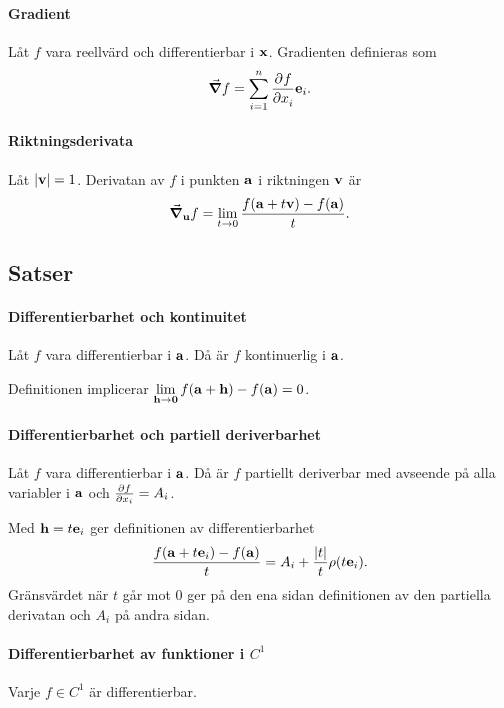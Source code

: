 \paragraph{Gradient}
Låt $f$ vara reellvärd och differentierbar i $\vect{x}$. Gradienten definieras som
\begin{align*}
	\grad{f} = \sum\limits_{i = 1}^{n}\pdeval{f}{x_i}{\vect{x}}\vect{e}_i.
\end{align*}

\paragraph{Riktningsderivata}
Låt $\abs{\vect{v}} = 1$. Derivatan av $f$ i punkten $\vect{a}$ i riktningen $\vect{v}$ är
\begin{align*}
	\grad_{\vect{u}}f = \limit{t}{0}\frac{f(\vect{a} + t\vect{v}) - f(\vect{a})}{t}.
\end{align*}

\subsection{Satser}

\paragraph{Differentierbarhet och kontinuitet}
Låt $f$ vara differentierbar i $\vect{a}$. Då är $f$ kontinuerlig i $\vect{a}$.

\proof
Definitionen implicerar $\limit{\vect{h}}{\vect{0}}f(\vect{a} + \vect{h}) - f(\vect{a}) = 0$.

\paragraph{Differentierbarhet och partiell deriverbarhet}
Låt $f$ vara differentierbar i $\vect{a}$. Då är $f$ partiellt deriverbar med avseende på alla variabler i $\vect{a}$ och $\pdv{f}{x_i}(\vect{a}) = A_i$.

\proof
Med $\vect{h} = t\vect{e}_i$ ger definitionen av differentierbarhet
\begin{align*}
	\frac{f(\vect{a} + t\vect{e}_i) - f(\vect{a})}{t} = A_i + \frac{\abs{t}}{t}\rho(t\vect{e}_i).
\end{align*}
Gränsvärdet när $t$ går mot $0$ ger på den ena sidan definitionen av den partiella derivatan och $A_i$ på andra sidan.

\paragraph{Differentierbarhet av funktioner i $C^1$}
Varje $f\in C^1$ är differentierbar.

